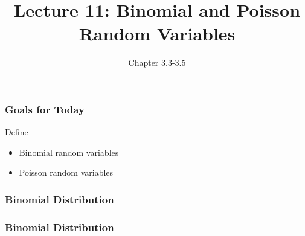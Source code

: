 \documentclass[handout]{beamer}
\title{Lecture 11: Binomial and Poisson Random Variables}
\author{Chapter 3.3-3.5}
\date{}
\newcommand{\blue}[1]{\textcolor{blue2}{#1}}
\begin{document}
\begin{frame}
\titlepage
\end{frame}


\begin{frame}[fragile]
\frametitle{Goals for Today}

Define
\begin{itemize}
\item Binomial random variables
\item Poisson random variables
\end{itemize}


\end{frame}


\begin{frame}
\frametitle{Binomial Distribution}

%
%
%


\end{frame}


\begin{frame}
\frametitle{Binomial Distribution}

%
%
%
%

\end{frame}
\end{document}
